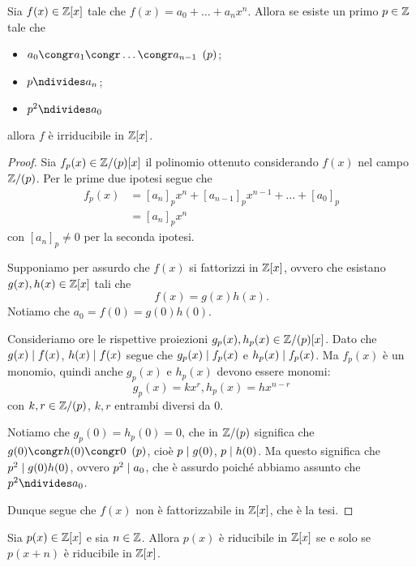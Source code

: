 \begin{proposition}
     \label{criterio_eisenstein}
    Sia $f(x) \in \mathbb{Z}[x]$ tale che $f(x) = a_0 + \dots + a_nx^n$. Allora se esiste un primo $p \in \mathbb{Z}$ tale che \begin{itemize}
        \item $a_0 \congr a_1 \congr \dots \congr a_{n-1} \Mod{p}$;
        \item $p \ndivides a_n$;
        \item $p^2 \ndivides a_0$
    \end{itemize}
    allora $f$ è irriducibile in $\mathbb{Z}[x]$.
\end{proposition}
\begin{proof}
    Sia $f_p(x) \in \mathbb{Z}/(p)[x]$ il polinomio ottenuto considerando $f(x)$ nel campo $\mathbb{Z}/(p)$. Per le prime due ipotesi segue che \begin{align*}
        f_p(x) &= [a_n]_px^n + [a_{n-1}]_px^{n-1} + \dots + [a_0]_p \\
        &= [a_n]_px^n
    \end{align*} con $[a_n]_p \neq 0$ per la seconda ipotesi.

    Supponiamo per assurdo che $f(x)$ si fattorizzi in $\mathbb{Z}[x]$, ovvero che esistano $g(x), h(x) \in \mathbb{Z}[x]$ tali che \[
        f(x) = g(x)h(x).
    \] Notiamo che $a_0 = f(0) = g(0)h(0)$. 
    
    Consideriamo ore le rispettive proiezioni $g_p(x), h_p(x) \in \mathbb{Z}/(p)[x]$. Dato che $g(x) \mid f(x)$, $h(x) \mid f(x)$ segue che $g_p(x) \mid f_p(x)$ e $h_p(x) \mid f_p(x)$. Ma $f_p(x)$ è un monomio, quindi anche $g_p(x)$ e $h_p(x)$ devono essere monomi:
    \[
        g_p(x) = kx^r, h_p(x) = hx^{n-r}    
    \] con $k, r \in \mathbb{Z}/(p)$, $k, r$ entrambi diversi da $0$.

    Notiamo che $g_p(0) = h_p(0) = 0$, che in $\mathbb{Z}/(p)$ significa che $g(0) \congr h(0) \congr 0 \Mod{p}$, cioè $p \mid g(0)$, $p \mid h(0)$. Ma questo significa che $p^2 \mid g(0)h(0)$, ovvero $p^2 \mid a_0$, che è assurdo poiché abbiamo assunto che $p^2 \ndivides a_0$.

    Dunque segue che $f(x)$ non è fattorizzabile in $\mathbb{Z}[x]$, che è la tesi.
\end{proof}

\begin{proposition}
     \label{criterio_sost}
    Sia $p(x) \in \mathbb{Z}[x]$ e sia $n \in \mathbb{Z}$. Allora $p(x)$ è riducibile in $\mathbb{Z}[x]$ se e solo se $p(x+n)$ è riducibile in $\mathbb{Z}[x]$.
\end{proposition}


